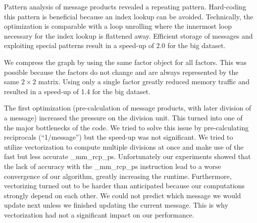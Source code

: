 Pattern analysis of message products revealed a repeating pattern. Hard-coding this pattern is beneficial because an index lookup can be avoided. Technically, the optimization is comparable with a loop unrolling where the innermost loop necessary for the index lookup is flattened away.
Efficient storage of messages and exploiting special patterns result in a speed-up of 2.0 for the big dataset.

We compress the graph by using the same factor object for all factors. This was possible because the factors do not change and are always represented by the same $2\times2$ matrix. Using only a single factor greatly reduced memory traffic and resulted in a speed-up of 1.4 for the big dataset.

The first optimization (pre-calculation of message products, with later division of a message) increased the pressure on the division unit. This turned into one of the major bottlenecks of the code. We tried to solve this issue by pre-calculating reciprocals (“1/message”) but the speed-up was not significant. We tried to utilize vectorization to compute multiple divisions at once and make use of the fast but less accurate \_mm\_rcp\_ps. Unfortunately our experiments showed that the lack of accuracy with the \_mm\_rcp\_ps instruction lead to a worse convergence of our algorithm, greatly increasing the runtime. Furthermore, vectorizing turned out to be harder than anticipated because our computations strongly depend on each other. We could not predict which message we would update next unless we finished updating the current message. This is why vectorization had not a significant impact on our performance.



